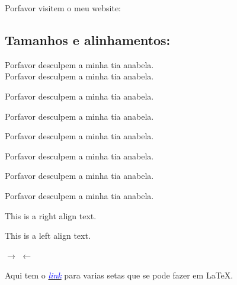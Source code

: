\documentclass[a4paper]{article}
\begin{document}
Porfavor visitem o meu website: 
\subsection{Tamanhos e alinhamentos:}
\begin{center}

Porfavor desculpem a minha tia anabela.\\

\tiny
Porfavor desculpem a minha tia anabela.

\small
Porfavor desculpem a minha tia anabela.

\normalsize
Porfavor desculpem a minha tia anabela.

\large
Porfavor desculpem a minha tia anabela.

\Large
Porfavor desculpem a minha tia anabela.

\huge
Porfavor desculpem a minha tia anabela.

\Huge
Porfavor desculpem a minha tia anabela.

\end{center}

\begin{flushright}

 This is a right align text.
\end{flushright}

\begin{flushleft}
 This is a left align text.
\end{flushleft}

$\rightarrow$
$\leftarrow$

Aqui tem o \href{http://www.sascha-frank.com/Arrow/latex-arrows.html}{\textit{\textcolor{blue}{link}}} para varias setas que se pode fazer em \LaTeX{}.
\end{document}
